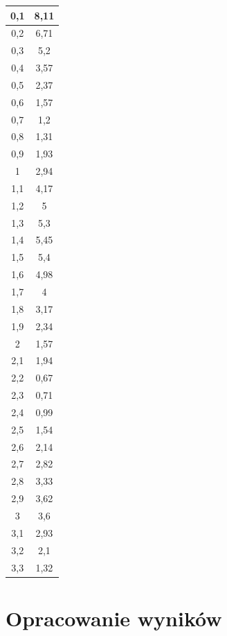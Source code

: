 \documentclass{fizykalab}
\begin{document}
\begin{table}[H]
\begin{tabular}{|c|c|}
        0,1 & 8,11 \\ \hline
        0,2 & 6,71 \\ \hline
        0,3 & 5,2 \\ \hline
        0,4 & 3,57 \\ \hline
        0,5 & 2,37 \\ \hline
        0,6 & 1,57 \\ \hline
        0,7 & 1,2 \\ \hline
        0,8 & 1,31 \\ \hline
        0,9 & 1,93 \\ \hline
        1 & 2,94 \\ \hline
        1,1 & 4,17 \\ \hline
        1,2 & 5 \\ \hline
        1,3 & 5,3 \\ \hline
        1,4 & 5,45 \\ \hline
        1,5 & 5,4 \\ \hline
        1,6 & 4,98 \\ \hline
        1,7 & 4 \\ \hline
        1,8 & 3,17 \\ \hline
        1,9 & 2,34 \\ \hline
        2 & 1,57 \\ \hline
        2,1 & 1,94 \\ \hline
        2,2 & 0,67 \\ \hline
        2,3 & 0,71 \\ \hline
        2,4 & 0,99 \\ \hline
        2,5 & 1,54 \\ \hline
        2,6 & 2,14 \\ \hline
        2,7 & 2,82 \\ \hline
        2,8 & 3,33 \\ \hline
        2,9 & 3,62 \\ \hline
        3 & 3,6 \\ \hline
        3,1 & 2,93 \\ \hline
        3,2 & 2,1 \\ \hline
        3,3 & 1,32 \\ \hline
    \end{tabular}
\end{table}

\section{Opracowanie wyników}
\end{document}
